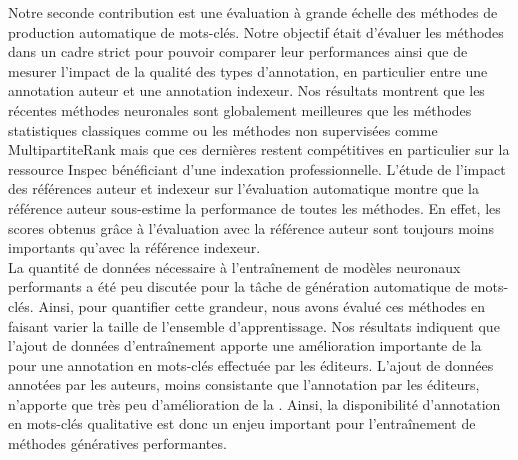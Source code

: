 Notre seconde contribution est une évaluation à grande échelle des méthodes de production automatique de mots-clés.
Notre objectif était d'évaluer les méthodes dans un cadre strict pour pouvoir comparer leur performances ainsi que de mesurer l'impact de la qualité des types d'annotation, en particulier entre une annotation auteur et une annotation indexeur.
%
Nos résultats montrent que les récentes méthodes neuronales sont globalement meilleures que les méthodes statistiques classiques comme \tfidf{} ou les méthodes non supervisées comme MultipartiteRank mais que ces dernières restent compétitives en particulier sur la ressource Inspec bénéficiant d'une indexation professionnelle.
L'étude de l'impact des références auteur et indexeur sur l'évaluation automatique  montre que la référence auteur sous-estime la performance de toutes les méthodes.
En effet, les scores obtenus grâce à l'évaluation avec la référence auteur sont toujours moins importants qu'avec la référence indexeur.
\\
La quantité de données nécessaire à l'entraînement de modèles neuronaux performants a été peu discutée pour la tâche de génération automatique de mots-clés.
Ainsi, pour quantifier cette grandeur, nous avons évalué ces méthodes en faisant varier la taille de l'ensemble d'apprentissage. 
Nos résultats indiquent que l'ajout de données d'entraînement apporte une amélioration importante de la \fmesure{} pour une annotation en mots-clés effectuée par les éditeurs.
L'ajout de données annotées par les auteurs, moins consistante que l'annotation par les éditeurs, n'apporte que très peu d'amélioration de la \fmesure{}.
Ainsi, la disponibilité d'annotation en mots-clés qualitative est donc un enjeu important pour l'entraînement de méthodes génératives performantes.

